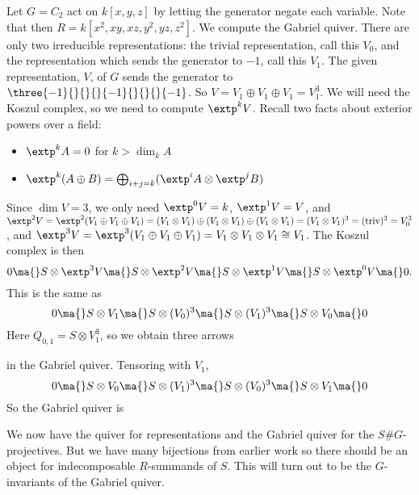 \begin{ex}
Let $G= C_2$ act on $k[x,y,z]$ by letting the generator negate each variable. Note that then $R= k[x^2,xy,xz,y^2,yz,z^2]$. We compute the Gabriel quiver. There are only two irreducible representations: the trivial representation, call this $V_0$, and the representation which sends the generator to $-1$, call this $V_1$. The given representation, $V$, of $G$ sends the generator to $\three{-1}{}{}{}{-1}{}{}{}{-1}$. So $V= V_1 \oplus V_1 \oplus V_1= V_1^3$. We will need the Koszul complex, so we need to compute $\extp^kV$. Recall two facts about exterior powers over a field:
	\begin{itemize}
	\item $\extp^kA= 0$ for $k> \dim_k A$
	\item $\extp^k (A \oplus B)= \bigoplus_{i+j=k} (\extp^i A \otimes \extp^jB)$
	\end{itemize}
Since $\dim V= 3$, we only need $\extp^0V= k$, $\extp^1V= V$, and $\extp^2V= \extp^2( V_1 \oplus V_1 \oplus V_1)= (V_1 \otimes V_1) \oplus (V_1 \otimes V_1) \oplus (V_1 \otimes V_1)= (V_1 \otimes V_1)^3=(\text{triv})^3= V_0^3$, and $\extp^3V= \extp^3(V_1 \oplus V_1 \oplus V_1)= V_1 \otimes V_1 \otimes V_1 \cong V_1$. The Koszul complex is then 
	\[
	0  \ma{} S \otimes \extp^3V \ma{} S \otimes \extp^2V \ma{} S \otimes \extp^1V \ma{} S \otimes \extp^0V \ma{} 0.
	\]
This is the same as
	\[
	0 \ma{} S \otimes V_1 \ma{} S \otimes (V_0)^3 \ma{} S \otimes (V_1)^3 \ma{} S \otimes V_0 \ma{} 0
	\]
Here $Q_{0,1}= S \otimes V_1^3$, so we obtain three arrows 


in the Gabriel quiver. Tensoring with $V_1$, 
	\[
	0 \ma{} S \otimes V_0 \ma{} S \otimes (V_1)^3 \ma{} S \otimes (V_0)^3 \ma{} S \otimes V_1 \ma{} 0
	\]
So the Gabriel quiver is 

\end{ex}

We now have the \mc quiver for representations and the Gabriel quiver for the $S\#G$-projectives. But we have many bijections from earlier work so there should be an object for indecomposable $R$-summands of $S$. This will turn out to be the $G$-invariants of the Gabriel quiver. 






